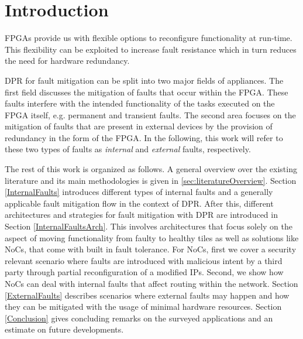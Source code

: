 
\section{Introduction}\label{Introduction}
\glspl{FPGA} provide us with flexible options to reconfigure functionality at run-time. 
This flexibility can be exploited to increase fault resistance which in turn reduces the need for hardware redundancy. 

\gls{DPR} for fault mitigation can be split into two major fields of appliances. 
The first field discusses the mitigation of faults that occur within the \gls{FPGA}.
These faults interfere with the intended functionality of the tasks executed on the \gls{FPGA} itself, e.g. permanent and transient faults. 
The second area focuses on the mitigation of faults that are present in external devices by the provision of redundancy in the form of the \gls{FPGA}.
In the following, this work will refer to these two types of faults as \textit{internal} and \textit{external} faults, respectively.

The rest of this work is organized as follows.
A general overview over the existing literature and its main methodologies is given in \ref{sec:literatureOverview}.
Section \ref{InternalFaults} introduces different types of internal faults and a generally applicable fault mitigation flow in the context of \gls{DPR}.
After this, different architectures and strategies for fault mitigation with \gls{DPR} are introduced in Section \ref{InternalFaultsArch}.
This involves architectures that focus solely on the aspect of moving functionality from faulty to healthy tiles as well as solutions like \glspl{NoC}, that come with built in fault tolerance. 
For \glspl{NoC}, first we cover a security relevant scenario where faults are introduced with malicious intent by a third party through partial reconfiguration of a modified \glspl{IP}.
Second, we show how \glspl{NoC} can deal with internal faults that affect routing within the network.  
Section \ref{ExternalFaults} describes scenarios where external faults may happen and how they can be mitigated with the usage of minimal hardware resources. 
Section \ref{Conclusion} gives concluding remarks on the surveyed applications and an estimate on future developments.


